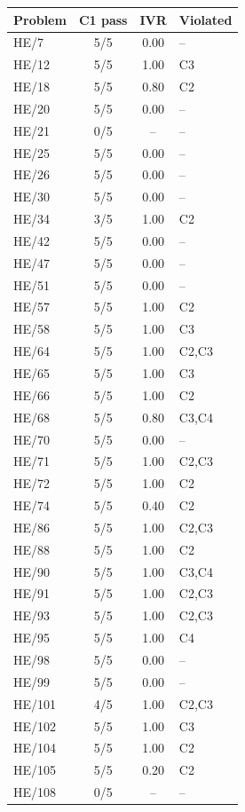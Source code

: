 \documentclass[11pt]{article}
\begin{document}
\begin{table}[ht]
\centering
\small
\begin{tabular}{@{}lccl@{}}
\toprule
\textbf{Problem} & \textbf{C1 pass} & \textbf{IVR} & \textbf{Violated} \\
\midrule
HE/7 & 5/5 & 0.00 & -- \\
HE/12 & 5/5 & 1.00 & C3 \\
HE/18 & 5/5 & 0.80 & C2 \\
HE/20 & 5/5 & 0.00 & -- \\
HE/21 & 0/5 & -- & -- \\
HE/25 & 5/5 & 0.00 & -- \\
HE/26 & 5/5 & 0.00 & -- \\
HE/30 & 5/5 & 0.00 & -- \\
HE/34 & 3/5 & 1.00 & C2 \\
HE/42 & 5/5 & 0.00 & -- \\
HE/47 & 5/5 & 0.00 & -- \\
HE/51 & 5/5 & 0.00 & -- \\
HE/57 & 5/5 & 1.00 & C2 \\
HE/58 & 5/5 & 1.00 & C3 \\
HE/64 & 5/5 & 1.00 & C2,C3 \\
HE/65 & 5/5 & 1.00 & C3 \\
HE/66 & 5/5 & 1.00 & C2 \\
HE/68 & 5/5 & 0.80 & C3,C4 \\
HE/70 & 5/5 & 0.00 & -- \\
HE/71 & 5/5 & 1.00 & C2,C3 \\
HE/72 & 5/5 & 1.00 & C2 \\
HE/74 & 5/5 & 0.40 & C2 \\
HE/86 & 5/5 & 1.00 & C2,C3 \\
HE/88 & 5/5 & 1.00 & C2 \\
HE/90 & 5/5 & 1.00 & C3,C4 \\
HE/91 & 5/5 & 1.00 & C2,C3 \\
HE/93 & 5/5 & 1.00 & C2,C3 \\
HE/95 & 5/5 & 1.00 & C4 \\
HE/98 & 5/5 & 0.00 & -- \\
HE/99 & 5/5 & 0.00 & -- \\
HE/101 & 4/5 & 1.00 & C2,C3 \\
HE/102 & 5/5 & 1.00 & C3 \\
HE/104 & 5/5 & 1.00 & C2 \\
HE/105 & 5/5 & 0.20 & C2 \\
HE/108 & 0/5 & -- & -- \\

\end{tabular}
\end{table}
\end{document}
